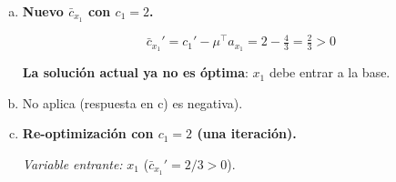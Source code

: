 \documentclass{article}
\begin{document}
\begin{enumerate}[a)]
\textbf{Precios duales:} $\mu=c_\mathcal{B}^\top B^{-1}=(c_{x_2},c_{x_3})B^{-1}=(1,3)\frac{1}{3}\begin{bmatrix}4&-5\\-1&2\end{bmatrix}=\frac{1}{3}[4-3,\;-5+6]=\frac{1}{3}[1,1]=\left(\tfrac{1}{3},\tfrac{1}{3}\right)$

\textbf{Costos reducidos} $\bar{c}_j=c_j-\mu^\top a_j$:
\begin{align*}
\bar{c}_{x_1}&=1-\left(\tfrac{1}{3},\tfrac{1}{3}\right)(2,2)^\top=1-\tfrac{4}{3}=-\tfrac{1}{3}\\
\bar{c}_{x_4}&=2-\left(\tfrac{1}{3},\tfrac{1}{3}\right)(5,2)^\top=2-\tfrac{7}{3}=-\tfrac{1}{3}\\
\bar{c}_{s_1}&=0-\left(\tfrac{1}{3},\tfrac{1}{3}\right)(1,0)^\top=0-\tfrac{1}{3}=-\tfrac{1}{3}\\
\bar{c}_{s_2}&=0-\left(\tfrac{1}{3},\tfrac{1}{3}\right)(0,1)^\top=0-\tfrac{1}{3}=-\tfrac{1}{3}
\end{align*}

Todos $-1/3<0$: \textbf{base óptima confirmada}.

\textbf{Diccionario óptimo} ($x_\mathcal{B}=B^{-1}b-B^{-1}N\cdot x_\mathcal{N}$, con signo $-\bar{a}_{ij}$ en el diccionario):
$$\begin{aligned}
x_2 &= \tfrac{20}{3} + \tfrac{2}{3}x_1 - \tfrac{10}{3}x_4 - \tfrac{4}{3}s_1 + \tfrac{5}{3}s_2 \\
x_3 &= \tfrac{4}{3}  - \tfrac{2}{3}x_1 + \tfrac{1}{3}x_4 + \tfrac{1}{3}s_1 - \tfrac{2}{3}s_2 \\
Z   &= \tfrac{32}{3} - \tfrac{1}{3}x_1 - \tfrac{1}{3}x_4 - \tfrac{1}{3}s_1 - \tfrac{1}{3}s_2
\end{aligned}$$

\textit{Nota:} $Z^*=\tfrac{32}{3}$ porque $\mu^\top b=\tfrac{1}{3}(20+12)=\tfrac{32}{3}$. \checkmark

\item \textbf{Nuevo $\bar{c}_{x_1}$ con $c_1=2$.}

$$\bar{c}_{x_1}'=c_1'-\mu^\top a_{x_1}=2-\tfrac{4}{3}=\tfrac{2}{3}>0$$

\textbf{La solución actual ya no es óptima}: $x_1$ debe entrar a la base.

\item No aplica (respuesta en c) es negativa).

\item \textbf{Re-optimización con $c_1=2$ (una iteración).}

\textit{Variable entrante:} $x_1$ ($\bar{c}_{x_1}'=2/3>0$).


\end{enumerate}
\end{document}
